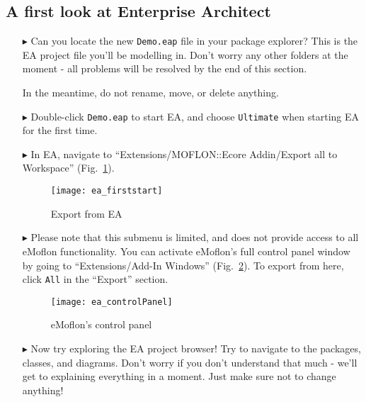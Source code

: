 \clearpage
\visHeader

\subsection{A first look at Enterprise Architect}

\begin{itemize}
\FloatBarrier
\hypertarget{simpleDemo vis}{}
\item[$\blacktriangleright$] Can you locate the new \texttt{Demo.eap} file in your package explorer? This is the EA project file you'll be
modelling in. Don't worry any other folders at the moment - all problems will be resolved by the end of this section.

In the meantime, do not rename, move, or delete anything.

\item[$\blacktriangleright$] Double-click \texttt{Demo.eap} to start EA, and choose \texttt{Ultimate} when starting EA for the first time.

\item[$\blacktriangleright$] In EA, navigate to ``Extensions/MOFLON::Ecore Addin/Export\- all\- to\- Workspace'' (Fig.~\ref{fig:ea}). 

\begin{figure}[htbp]
	\centering
  \texttt{[image: ea\_firststart]}
	\caption{Export from EA} 
	\label{fig:ea} 
\end{figure}

\item[$\blacktriangleright$] Please note that this submenu is limited, and does not provide access to all eMoflon functionality. You can activate eMoflon's full
control panel window by going to ``Extensions/Add-In Windows'' (Fig.~\ref{fig:controlPanel}). To export from here, click \texttt{All} in the ``Export'' section.

\begin{figure}[htbp]
	\centering
  \texttt{[image: ea\_controlPanel]}
	\caption{eMoflon's control panel} 
	\label{fig:controlPanel} 
\end{figure}

\item[$\blacktriangleright$] Now try exploring the EA project browser! Try to navigate to the packages, classes, and diagrams. Don't worry if you don't
understand that much - we'll get to explaining everything in a moment. Just make sure not to change anything!

\newpage


\end{itemize}
